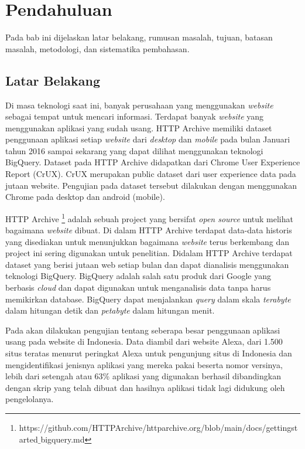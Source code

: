 \chapter{Pendahuluan}
\label{chap:intro}
Pada bab ini dijelaskan latar belakang, rumusan masalah, tujuan, batasan masalah, metodologi, dan sistematika pembahasan.
\section{Latar Belakang}
\label{sec:label}
Di masa teknologi saat ini, banyak perusahaan yang menggunakan \textit{website} sebagai tempat untuk mencari informasi. Terdapat banyak \textit{website} yang menggunakan aplikasi yang sudah usang. HTTP Archive memiliki dataset penggunaan aplikasi setiap \textit{website} dari \textit{desktop} dan \textit{mobile} pada bulan Januari tahun 2016 sampai sekarang yang dapat dilihat menggunakan teknologi BigQuery. Dataset pada HTTP Archive didapatkan dari Chrome User Experience Report (CrUX). CrUX merupakan public dataset dari user experience data pada jutaan website. Pengujian pada dataset tersebut dilakukan dengan menggunakan Chrome pada desktop dan android (mobile). 

HTTP Archive \footnote{https://github.com/HTTPArchive/httparchive.org/blob/main/docs/gettingstarted$\_$bigquery.md} adalah sebuah project yang bersifat \textit{open source} untuk melihat bagaimana \textit{website} dibuat. Di dalam HTTP Archive terdapat data-data historis yang disediakan untuk menunjukkan bagaimana \textit{website} terus berkembang dan project ini sering digunakan untuk penelitian. Didalam HTTP Archive terdapat dataset yang berisi jutaan web setiap bulan dan dapat dianalisis menggunakan teknologi BigQuery. BigQuery \cite{bqIntroduction} adalah salah satu produk dari Google yang berbasis \textit{cloud} dan dapat digunakan untuk menganalisis data tanpa harus memikirkan database. BigQuery dapat menjalankan \textit{query} dalam skala \textit{terabyte} dalam hitungan detik dan \textit{petabyte} dalam hitungan menit.

Pada \cite{pascal} akan dilakukan pengujian tentang seberapa besar penggunaan aplikasi usang pada website di Indonesia. Data diambil dari website Alexa, dari 1.500 situs teratas menurut peringkat Alexa untuk pengunjung situs di Indonesia dan mengidentifikasi jenisnya aplikasi yang mereka pakai beserta nomor versinya, lebih dari setengah atau 63\% aplikasi yang digunakan berhasil dibandingkan dengan skrip yang telah dibuat dan hasilnya aplikasi tidak lagi didukung oleh pengelolanya.


